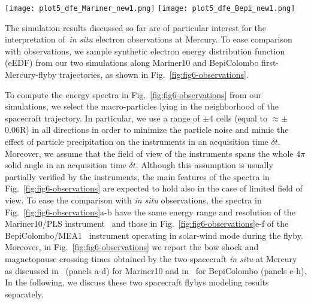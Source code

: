 \documentclass{aa}
\begin{document}
\begin{figure*}
	\centering
	\texttt{[image: plot5\_dfe\_Mariner\_new1.png]}
	\texttt{[image: plot5\_dfe\_Bepi\_new1.png]}
	\caption{Synthetic electron energy distribution functions (eEDF) sampled along Mariner10 (a)-(d) and BepiColombo (e)-(h) first Mercury flybys in our simulations boxes using northward IMF (left panels) and southward IMF (right panels) conditions.
	The plots are done using simulation results at time=14.7$R/V_x$.
	The energy ranges and resolutions used to compute the eEDF are the same as those of the instruments PLS (onboard Mariner, top) and MEA1 (onboard BepiColombo, bottom). 
	The horizontal axis shows the time from closest approach (CA) in minutes, $t=0$ is highlighted using vertical red dashed line.
	On the time axis, we highlight the bow shock (BS) and magnetopause (MP) crossings obtained by the two spacecraft \textit{in-situ}, these are highlighted using grey areas and vertical black dashed lines.
	The electron density is obtained by integrating the synthetic eEDF in energy at each given time.} 
	\label{fig:fig6-observations}
\end{figure*}

The simulation results discussed so far are of particular interest for the interpretation of~\textit{in situ} electron observations at Mercury. To ease comparison with observations, we sample synthetic electron energy distribution function (eEDF) from our two simulations along Mariner10 and BepiColombo first-Mercury-flyby trajectories, as shown in Fig.~\ref{fig:fig6-observations}.

 To compute the energy spectra in Fig.~\ref{fig:fig6-observations} from our simulations, we select the macro-particles lying in the neighborhood of the spacecraft trajectory. In particular, we use a range of $\pm4$ cells (equal to $\approx \pm$0.06R) in all directions in order to minimize the particle noise and mimic the effect of particle precipitation on the instruments in an acquisition time $\delta t$. Moreover, we assume that the field of view of the instruments spans the whole $4\pi$ solid angle in an acquisition time $\delta t$. Although this assumption is usually partially verified by the instruments, the main features of the spectra in Fig.~\ref{fig:fig6-observations} are expected to hold also in the case of limited field of view.
 To ease the comparison with \textit{in situ} observations, the spectra in Fig.~\ref{fig:fig6-observations}a-b have the same energy range and resolution of the Mariner10/PLS instrument~\citep{Ogilvie1974} and those in Fig.~\ref{fig:fig6-observations}e-f of the BepiColombo/MEA1~\citep{Saito2021} instrument operating in solar-wind mode during the flyby. Moreover, in Fig.~\ref{fig:fig6-observations} we report the bow shock and magnetopause crossing times obtained by the two spacecraft \textit{in situ} at Mercury as discussed in~\citet{Russell1988} (panels a-d) for Mariner10 and in~\citet{Andre2022} for BepiColombo (panels e-h).
 In the following, we discuss these two spacecraft flybys modeling results separately.
\end{document}
